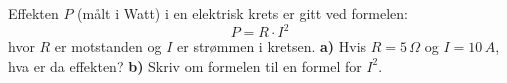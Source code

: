Effekten $ P $ (målt i Watt) i en elektrisk krets er gitt ved formelen:
\[ P=R\cdot I^2 \]
hvor $ R $ er motstanden og $ I $ er strømmen i kretsen.\os
\textbf{a)} Hvis $ {R=5\,\Omega} $ og $ {I=10\,A} $, hva er da effekten?\os
\textbf{b)} Skriv om formelen til en formel for $ I^2 $.

